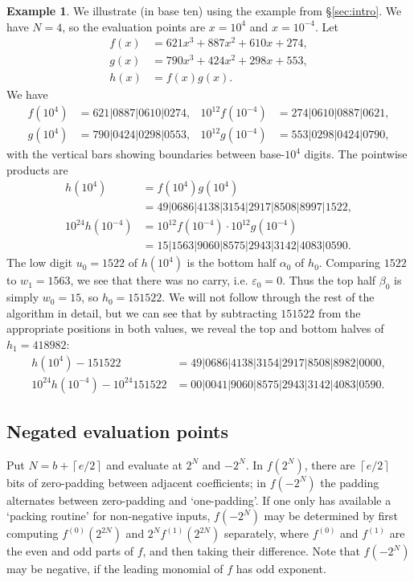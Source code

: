 \documentclass{amsart}
\newcommand{\ep}{\varepsilon}
\newcommand{\ceil}[1]{\left\lceil{#1}\right\rceil}
\theoremstyle{definition}
\newtheorem{example}[thm]{Example}
\theoremstyle{remark}
\begin{document}
\begin{example}
We illustrate (in base ten) using the example from \S\ref{sec:intro}. We have $N = 4$, so the evaluation points are $x = 10^4$ and $x = 10^{-4}$. Let
\begin{align*}
  f(x) & = 621x^3 + 887x^2 + 610x + 274, \\
  g(x) & = 790x^3 + 424x^2 + 298x + 553, \\
  h(x) & = f(x) g(x).
\end{align*}
We have
\begin{align*}
  f(10^4) & = 621|0887|0610|0274, &  10^{12} f(10^{-4}) & = 274|0610|0887|0621, \\
  g(10^4) & = 790|0424|0298|0553, &  10^{12} g(10^{-4}) & = 553|0298|0424|0790,
\end{align*}
with the vertical bars showing boundaries between base-$10^4$ digits.
The pointwise products are
\begin{align*}
  h(10^4) & = f(10^4) g(10^4) \\
          & = 49|0686|4138|3154|2917|8508|8997|1522, \\
  10^{24} h(10^{-4}) & = 10^{12} f(10^{-4}) \cdot 10^{12} g(10^{-4}) \\
          & = 15|1563|9060|8575|2943|3142|4083|0590.
\end{align*}
The low digit $u_0 = 1522$ of $h(10^4)$ is the bottom half $\alpha_0$ of $h_0$. Comparing $1522$ to $w_1 = 1563$, we see that there was no carry, i.e. $\ep_0 = 0$. Thus the top half $\beta_0$ is simply $w_0 = 15$, so $h_0 = 151522$. We will not follow through the rest of the algorithm in detail, but we can see that by subtracting $151522$ from the appropriate positions in both values, we reveal the top and bottom halves of $h_1 = 418982$:
\begin{align*}
  h(10^4) - 151522 & = 49|0686|4138|3154|2917|8508|8982|0000, \\
  10^{24} h(10^{-4}) - 10^{24} 151522 & = 00|0041|9060|8575|2943|3142|4083|0590.
\end{align*}

\end{example}


\subsection{Negated evaluation points}
\label{sec:integer-negate}

Put $N = b + \ceil{e/2}$ and evaluate at $2^N$ and $-2^N$. In $f(2^N)$, there are $\ceil{e/2}$ bits of zero-padding between adjacent coefficients; in $f(-2^N)$ the padding alternates between zero-padding and `one-padding'. If one only has available a `packing routine' for non-negative inputs, $f(-2^N)$ may be determined by first computing $f^{(0)}(2^{2N})$ and $2^N f^{(1)}(2^{2N})$ separately, where $f^{(0)}$ and $f^{(1)}$ are the even and odd parts of $f$, and then taking their difference. Note that $f(-2^N)$ may be negative, if the leading monomial of $f$ has odd exponent.
\end{document}
